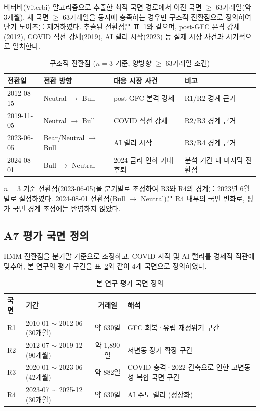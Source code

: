 \documentclass{article}
\begin{document}
비터비(Viterbi) 알고리즘으로 추출한 최적 국면 경로에서 이전 국면 $\geq$ 63거래일(약 3개월), 새 국면 $\geq$ 63거래일을 동시에 충족하는 경우만 구조적 전환점으로 정의하여 단기 노이즈를 제거하였다. 추출된 전환점은 표~\ref{tab:a1_breaks}와 같으며, post-GFC 본격 강세(2012), COVID 직전 강세(2019), AI 랠리 시작(2023) 등 실제 시장 사건과 시기적으로 일치한다.

\begin{table}[ht]
\centering
\caption{구조적 전환점 ($n=3$ 기준, 양방향 $\geq$ 63거래일 조건)}
\label{tab:a1_breaks}
\begin{tabular}{llll}
\toprule
\textbf{전환일} & \textbf{전환 방향} & \textbf{대응 시장 사건} & \textbf{비고} \\
\midrule
2012-08-15 & Neutral $\rightarrow$ Bull & post-GFC 본격 강세      & R1/R2 경계 근거 \\
2019-11-05 & Neutral $\rightarrow$ Bull & COVID 직전 강세         & R2/R3 경계 근거 \\
2023-06-05 & Bear/Neutral $\rightarrow$ Bull & AI 랠리 시작       & R3/R4 경계 근거 \\
2024-08-01 & Bull $\rightarrow$ Neutral & 2024 금리 인하 기대 후퇴 & 분석 기간 내 마지막 전환점 \\
\bottomrule
\end{tabular}
\end{table}

$n = 3$ 기준 전환점(2023-06-05)을 분기말로 조정하여 R3와 R4의 경계를 2023년 6월 말로 설정하였다. 2024-08-01 전환점(Bull $\rightarrow$ Neutral)은 R4 내부의 국면 변화로, 평가 국면 경계 조정에는 반영하지 않았다.

\subsection*{A7 평가 국면 정의}

HMM 전환점을 분기말 기준으로 조정하고, COVID 시작 및 AI 랠리를 경제적 직관에 맞추어, 본 연구의 평가 구간을 표~\ref{tab:a1_regimes}와 같이 4개 국면으로 정의하였다.

\begin{table}[ht]
\centering
\caption{본 연구 평가 국면 정의}
\label{tab:a1_regimes}
\begin{tabular}{llcl}
\toprule
\textbf{국면} & \textbf{기간} & \textbf{거래일} & \textbf{해석} \\
\midrule
R1 & 2010-01 $\sim$ 2012-06 (30개월) & 약 630일   & GFC 회복·유럽 재정위기 구간 \\
R2 & 2012-07 $\sim$ 2019-12 (90개월) & 약 1,890일 & 저변동 장기 확장 구간 \\
R3 & 2020-01 $\sim$ 2023-06 (42개월) & 약 882일   & COVID 충격·2022 긴축으로 인한 고변동성 복합 국면 구간 \\
R4 & 2023-07 $\sim$ 2025-12 (30개월) & 약 630일   & AI 주도 랠리 (정상화) \\
\bottomrule
\end{tabular}
\end{table}
\end{document}
